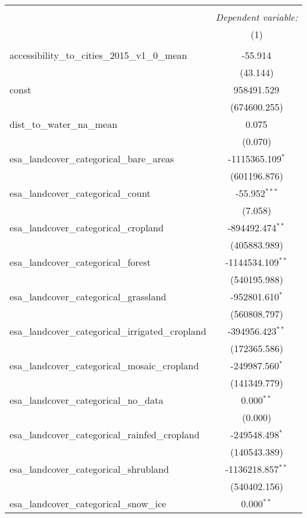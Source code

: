 \begin{table}[!htbp] \centering
\begin{tabular}{@{\extracolsep{5pt}}lc}
\\[-1.8ex]\hline
\hline \\[-1.8ex]
& \multicolumn{1}{c}{\textit{Dependent variable:}} \
\cr \cline{1-2}
\\[-1.8ex] & (1) \\
\hline \\[-1.8ex]
 accessibility_to_cities_2015_v1_0_mean & -55.914$^{}$ \\
  & (43.144) \\
 const & 958491.529$^{}$ \\
  & (674600.255) \\
 dist_to_water_na_mean & 0.075$^{}$ \\
  & (0.070) \\
 esa_landcover_categorical_bare_areas & -1115365.109$^{*}$ \\
  & (601196.876) \\
 esa_landcover_categorical_count & -55.952$^{***}$ \\
  & (7.058) \\
 esa_landcover_categorical_cropland & -894492.474$^{**}$ \\
  & (405883.989) \\
 esa_landcover_categorical_forest & -1144534.109$^{**}$ \\
  & (540195.988) \\
 esa_landcover_categorical_grassland & -952801.610$^{*}$ \\
  & (560808.797) \\
 esa_landcover_categorical_irrigated_cropland & -394956.423$^{**}$ \\
  & (172365.586) \\
 esa_landcover_categorical_mosaic_cropland & -249987.560$^{*}$ \\
  & (141349.779) \\
 esa_landcover_categorical_no_data & 0.000$^{**}$ \\
  & (0.000) \\
 esa_landcover_categorical_rainfed_cropland & -249548.498$^{*}$ \\
  & (140543.389) \\
 esa_landcover_categorical_shrubland & -1136218.857$^{**}$ \\
  & (540402.156) \\
 esa_landcover_categorical_snow_ice & 0.000$^{**}$ \\

\end{tabular}
\end{table}
